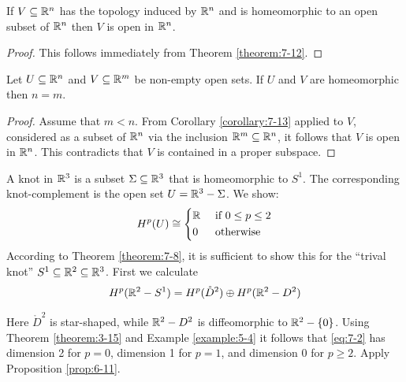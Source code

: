 \begin{corollary}\label{corollary:7-13}
  If $V\subseteq{\ensuremath{\mathbb{R}}}^n$ has the topology induced by ${\mathbb{R}}^n$ and is homeomorphic to an open subset of ${\mathbb{R}}^n$ then 
  $V$ is open in ${\mathbb{R}}^n$.
\end{corollary}

\begin{proof}
  This follows immediately from Theorem \ref{theorem:7-12}.
\end{proof}

\begin{corollary}\label{corollary:7-14}
  Let $U\subseteq {\ensuremath{\mathbb{R}}}^n$ and $V\subseteq {\ensuremath{\mathbb{R}}}^m$ be non-empty open sets. If $U$ and $V$ are homeomorphic
  then $n=m$.
\end{corollary}

\begin{proof}
  Assume that $m < n$. From Corollary \ref{corollary:7-13} applied to $V$, considered as a
subset of ${\mathbb{R}}^n$ via the inclusion ${\mathbb{R}}^m\subseteq{\ensuremath{\mathbb{R}}}^n$, it follows that $V$ is open in ${\mathbb{R}}^n$.
This contradicts that $V$ is contained in a proper subspace.
\end{proof}

\begin{example}\label{example:7-15}
  A knot in ${\mathbb{R}}^3$ is a subset $\Sigma\subseteq{\ensuremath{\mathbb{R}}}^3$ that is homeomorphic to $S^1$. The
corresponding knot-complement is the open set $U={\mathbb{R}}^3-\Sigma$. We show:
\begin{align*}
  H^p(U)\cong \left\{\begin{aligned}
    & {\mathbb{R}} && \text{ if } 0\le p\le 2 \\
    & 0 && \text{ otherwise }
  \end{aligned}\right.
\end{align*}
According to Theorem \ref{theorem:7-8}, it is sufficient to show this for the ``trival knot''
$S^1\subseteq {\ensuremath{\mathbb{R}}}^2\subseteq{\ensuremath{\mathbb{R}}}^3$. First we calculate
\begin{align}\label{eq:7-2}
  H^p({\mathbb{R}}^2-S^1) = H^p(\mathring{D}^2)\oplus H^p({\mathbb{R}}^2-D^2)
\end{align}

Here $\mathring{D}^2$ is star-shaped, while ${\mathbb{R}}^2-D^2$ is diffeomorphic 
to ${\mathbb{R}}^2-\{0\}$. Using Theorem \ref{theorem:3-15} and Example \ref{example:5-4} it follows 
that \eqref{eq:7-2} has dimension 2 for $p = 0$, dimension 1 for $p = 1$, and dimension 0 
for $p\ge 2$. Apply Proposition \ref{prop:6-11}.
\end{example}

